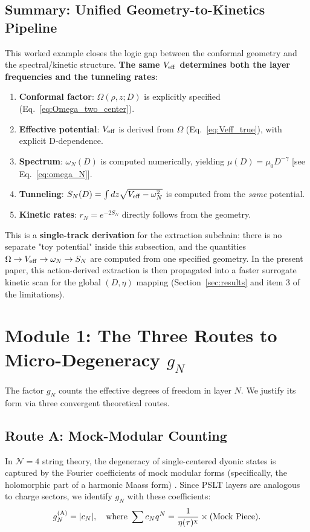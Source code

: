 \documentclass[aps,prd,onecolumn,notitlepage,nofootinbib,superscriptaddress,11pt,floatfix]{revtex4-2}
\begin{document}




\subsection{Summary: Unified Geometry-to-Kinetics Pipeline}
\label{sec:geometry_summary}

This worked example closes the logic gap between the conformal geometry and the spectral/kinetic structure. \textbf{The same $V_{\rm eff}$ determines both the layer frequencies and the tunneling rates}:
\begin{enumerate}
    \item \textbf{Conformal factor}: $\Omega(\rho, z; D)$ is explicitly specified (Eq.~\eqref{eq:Omega_two_center}).
    \item \textbf{Effective potential}: $V_{\rm eff}$ is derived from $\Omega$ (Eq.~\eqref{eq:Veff_true}), with explicit D-dependence.
    \item \textbf{Spectrum}: $\omega_N(D)$ is computed numerically, yielding $\mu(D) = \mu_0 D^{-\gamma}$ [see Eq.~\eqref{eq:omega_N}].
    \item \textbf{Tunneling}: $S_N(D) = \int dz \sqrt{V_{\rm eff} - \omega_N^2}$ is computed from the \emph{same} potential.
    \item \textbf{Kinetic rates}: $r_N = e^{-2S_N}$ directly follows from the geometry.
\end{enumerate}
This is a \textbf{single-track derivation} for the extraction subchain: there is no separate "toy potential" inside this subsection, and the quantities $\Omega \to V_{\rm eff} \to \omega_N \to S_N$ are computed from one specified geometry. In the present paper, this action-derived extraction is then propagated into a faster surrogate kinetic scan for the global $(D,\eta)$ mapping (Section~\ref{sec:results} and item 3 of the limitations).


\section{Module 1: The Three Routes to Micro-Degeneracy \texorpdfstring{$g_N$}{gN}}
\label{sec:gN}

The factor $g_N$ counts the effective degrees of freedom in layer $N$. We justify its form via three convergent theoretical routes.

\subsection{Route A: Mock-Modular Counting}
In $\mathcal{N}=4$ string theory, the degeneracy of single-centered dyonic states is captured by the Fourier coefficients of mock modular forms (specifically, the holomorphic part of a harmonic Maass form) \cite{DMZ2012}. Since PSLT layers are analogous to charge sectors, we identify $g_N$ with these coefficients:
\begin{equation}
g_N^{\rm (A)} = |c_N|, \quad \text{where } \sum c_N q^N = \frac{1}{\eta(\tau)^{\chi}} \times (\text{Mock Piece}).
\end{equation}
\end{document}
